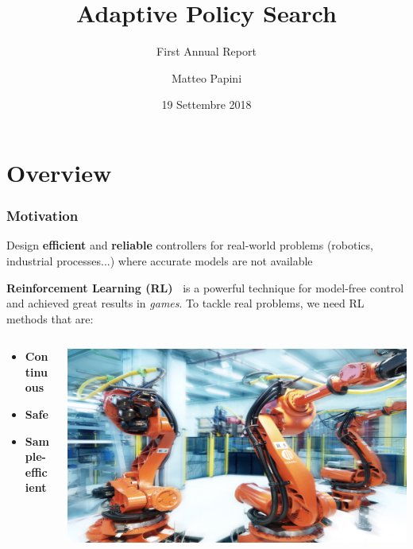 \documentclass{beamer}
\title[Adaptive Policy Search]{Adaptive Policy Search}
\subtitle{First Annual Report}
\author[M. Papini]{Matteo Papini}
\date[19/9/2018]{19 Settembre 2018}
\begin{document}

\begin{frame}
\titlepage
\end{frame}

\addtocounter{framenumber}{-1}



\section{Overview}

\begin{frame}
\frametitle{Motivation}
Design \textbf{efficient} and \textbf{reliable} controllers for real-world problems (robotics, industrial processes...) where accurate models are not available

\vfill

\textbf{Reinforcement Learning (RL)~\cite{sutton1998reinforcement}} is a powerful technique for model-free control and achieved great results in \textit{games}. To tackle real problems, we need RL methods that are:

\vfill

\begin{columns}
	\begin{column}{.6\textwidth}
		\begin{itemize}
			\item \textbf{Continuous}
			\item \textbf{Safe}
			\item \textbf{Sample-efficient}
		\end{itemize}
	\end{column}
	\begin{column}{.4\textwidth}
		\includegraphics[width=\textwidth]{pics/robots.jpg}
	\end{column}
\end{columns}


\end{frame}
\end{document}
